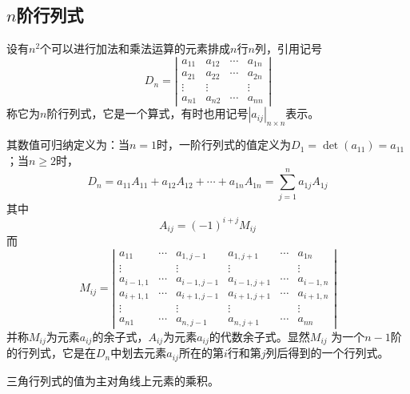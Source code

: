 \subsection{$n$阶行列式}
\begin{definition}[$n$阶行列式]
  设有$n^2$个可以进行加法和乘法运算的元素排成$n$行$n$列，引用记号
  $$
  D_{n}=\left|\begin{array}{cccc}
  a_{11} & a_{12} & \cdots & a_{1 n} \\
  a_{21} & a_{22} & \cdots & a_{2 n} \\
  \vdots & \vdots & & \vdots \\
  a_{n 1} & a_{n 2} & \cdots & a_{n n}
  \end{array}\right|
  $$
  称它为{\heiti $n$阶行列式}，它是一个算式，有时也用记号$|a_{ij}|_{n\times n}$表示。

  其数值可归纳定义为：当$n=1$时，一阶行列式的值定义为$D_1=\det (a_{11})=a_{11}$；当$n\geq 2$时，
  $$D_n=a_{11}A_{11}+a_{12}A_{12}+\cdots+a_{1n}A_{1n}=\sum _{j=1}^n a_{1j}A_{1j}$$
  其中$$A_{ij}={(-1)}^{i+j}M_{ij}$$
  而$$
  M_{i j}=\left|\begin{array}{cccccc}
  a_{11} & \cdots & a_{1, j-1} & a_{1, j+1} & \cdots & a_{1 n} \\
  \vdots & & \vdots & \vdots & & \vdots \\
  a_{i-1,1} & \cdots & a_{i-1, j-1} & a_{i-1, j+1} & \cdots & a_{i-1, n} \\
  a_{i+1,1} & \cdots & a_{i+1, j-1} & a_{i+1, j+1} & \cdots & a_{i+1, n} \\
  \vdots & & \vdots & \vdots & & \vdots \\
  a_{n 1} & \cdots & a_{n, j-1} & a_{n, j+1} & \cdots & a_{n n}
  \end{array}\right|
  $$
  并称$M_{ij}$为元素$a_{ij}$的{\heiti 余子式}，$A_{ij}$为元素$a_{ij}$的{\heiti 代数余子式}。显然$M_{ij}$
  为一个$n-1$阶的行列式，它是在$D_n$中划去元素$a_{ij}$所在的第$i$行和第$j$列后得到的一个行列式。
\end{definition}

\begin{remark}
  三角行列式的值为主对角线上元素的乘积。
\end{remark}

